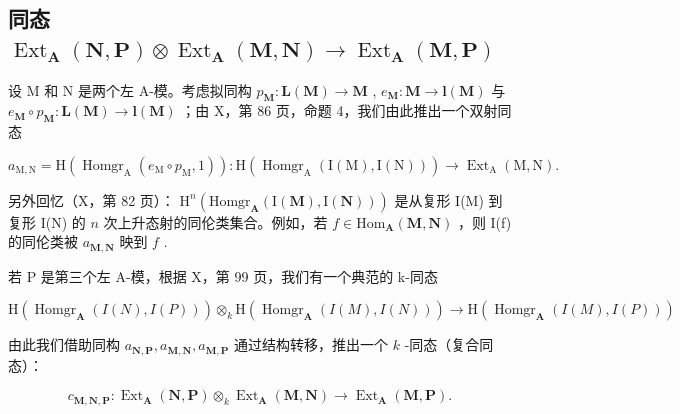 \subsection{\texorpdfstring{同态 \(\operatorname{Ext}_{\mathbf{A}}(\mathbf{N}, \mathbf{P}) \otimes \operatorname{Ext}_{\mathbf{A}}(\mathbf{M}, \mathbf{N}) \to \operatorname{Ext}_{\mathbf{A}}(\mathbf{M}, \mathbf{P})\)}{同态 \textbackslash operatorname\{Ext\}\_\{\textbackslash mathbf\{A\}\}(\textbackslash mathbf\{N\}, \textbackslash mathbf\{P\}) \textbackslash otimes \textbackslash operatorname\{Ext\}\_\{\textbackslash mathbf\{A\}\}(\textbackslash mathbf\{M\}, \textbackslash mathbf\{N\}) \textbackslash 到 \textbackslash operatorname\{Ext\}\_\{\textbackslash mathbf\{A\}\}(\textbackslash mathbf\{M\}, \textbackslash mathbf\{P\})}}

设 M 和 N 是两个左 A-模。考虑拟同构 \(p_{\mathbf{M}}: \mathbf{L}(\mathbf{M}) \to \mathbf{M}\) , \(e_{\mathbf{M}}: \mathbf{M} \to \mathbf{l}(\mathbf{M})\) 与 \(e_{\mathbf{M}} \circ p_{\mathbf{M}}: \mathbf{L}(\mathbf{M}) \to \mathbf{l}(\mathbf{M})\) ；由 X，第 86 页，命题 4，我们由此推出一个双射同态

\[
a _ {\mathrm{M}, \mathrm{N}} = \mathrm{H} (\operatorname{Homgr} _ {\mathrm{A}} (e _ {\mathrm{M}} \circ p _ {\mathrm{M}}, 1)): \mathrm{H} (\operatorname{Homgr} _ {\mathrm{A}} (\mathrm{I} (\mathrm{M}), \mathrm{I} (\mathrm{N}))) \rightarrow \operatorname{Ext} _ {\mathrm{A}} (\mathrm{M}, \mathrm{N}).
\]

另外回忆（X，第 82 页）： \(\mathrm{H}^n (\mathrm{Homgr}_{\mathbf{A}}(\mathrm{I}(\mathbf{M}),\mathrm{I}(\mathbf{N})))\) 是从复形 I(M) 到复形 I(N) 的 \(n\) 次上升态射的同伦类集合。例如，若 \(f\in \mathrm{Hom}_{\mathbf{A}}(\mathbf{M},\mathbf{N})\) ，则 I(f) 的同伦类被 \(a_{\mathbf{M},\mathbf{N}}\) 映到 \(f\) .

若 P 是第三个左 A-模，根据 X，第 99 页，我们有一个典范的 k-同态

\[
\mathrm{H} (\operatorname{Homgr} _ {\mathbf {A}} (I (N), I (P))) \otimes_ {k} \mathrm{H} (\operatorname{Homgr} _ {\mathbf {A}} (I (M), I (N))) \rightarrow \mathrm{H} (\operatorname{Homgr} _ {\mathbf {A}} (I (M), I (P)))
\]

由此我们借助同构 \(a_{\mathbf{N},\mathbf{P}}, a_{\mathbf{M},\mathbf{N}}, a_{\mathbf{M},\mathbf{P}}\) 通过结构转移，推出一个 \(k\) -同态（复合同态）：

\[
c _ {\mathbf {M}, \mathbf {N}, \mathbf {P}}: \operatorname{Ext} _ {\mathbf {A}} (\mathbf {N}, \mathbf {P}) \otimes_ {k} \operatorname{Ext} _ {\mathbf {A}} (\mathbf {M}, \mathbf {N}) \rightarrow \operatorname{Ext} _ {\mathbf {A}} (\mathbf {M}, \mathbf {P}).
\]

